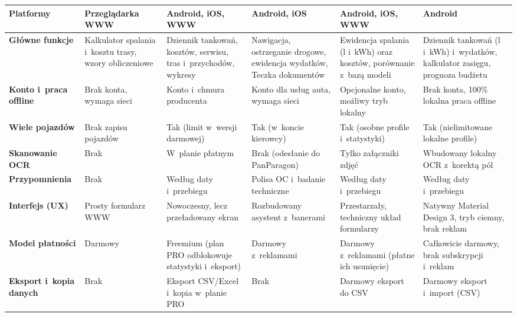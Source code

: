 \begin{landscape}
\begin{longtable}{|>{\centering\arraybackslash}m{2.7cm}|*{5}{>{\raggedright\arraybackslash}m{\dimexpr(\linewidth - 2.7cm - 12\tabcolsep - 7\arrayrulewidth)/5\relax}|}}
    \textbf{Platformy} & 
    Przeglądarka WWW & 
    Android, iOS, WWW & 
    Android, iOS & 
    Android, iOS, WWW & 
    Android \\
    \hline
    \textbf{Główne funkcje} & 
    Kalkulator spalania i~kosztu trasy, wzory obliczeniowe & 
    Dziennik tankowań, kosztów, serwisu, tras i~przychodów, wykresy & 
    Nawigacja, ostrzeganie drogowe, ewidencja wydatków, Teczka dokumentów & 
    Ewidencja spalania (l i~kWh) oraz kosztów, porównanie z~bazą modeli & 
    Dziennik tankowań (l i~kWh) i~wydatków, kalkulator zasięgu, prognoza budżetu \\
    \hline
    \textbf{Konto i~praca offline} & 
    Brak konta, wymaga sieci & 
    Konto i~chmura producenta & 
    Konto dla usług auta, wymaga sieci & 
    Opcjonalne konto, możliwy tryb lokalny & 
    Brak konta, 100\% lokalna praca offline \\
    \hline
    \textbf{Wiele pojazdów} & 
    Brak zapisu pojazdów & 
    Tak (limit w~wersji darmowej) & 
    Tak (w~koncie kierowcy) & 
    Tak (osobne profile i~statystyki) & 
    Tak (nielimitowane lokalne profile) \\
    \hline
    \textbf{Skanowanie OCR} & 
    Brak & 
    W~planie płatnym & 
    Brak (odesłanie do PanParagon) & 
    Tylko załączniki zdjęć & 
    Wbudowany lokalny OCR z~korektą pól \\
    \hline
    \textbf{Przypomnienia} & 
    Brak & 
    Według daty i~przebiegu & 
    Polisa OC i~badanie techniczne & 
    Według daty i~przebiegu & 
    Według daty i~przebiegu \\
    \hline
    \textbf{Interfejs (UX)} & 
    Prosty formularz WWW & 
    Nowoczesny, lecz przeładowany ekran & 
    Rozbudowany asystent z~banerami & 
    Przestarzały, techniczny układ formularzy & 
    Natywny Material Design 3, tryb ciemny, brak reklam \\
    \hline
    \textbf{Model płatności} & 
    Darmowy & 
    Freemium (plan PRO odblokowuje statystyki i~eksport) & 
    Darmowy z~reklamami & 
    Darmowy z~reklamami (płatne ich usunięcie) & 
    Całkowicie darmowy, brak subskrypcji i~reklam \\
    \hline
    \textbf{Eksport i~kopia danych} & 
    Brak & 
    Eksport CSV/Excel i~kopia w~planie PRO & 
    Brak & 
    Darmowy eksport do CSV & 
    Darmowy eksport i~import (CSV) \\
    \hline
\end{longtable}
\endgroup
\end{landscape}

